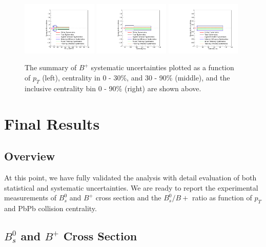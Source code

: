 \begin{figure}[hbtp]
\begin{center}
\includegraphics[width=0.32\textwidth]{Figures/Chapter5/BpPtSyst.pdf}
\includegraphics[width=0.32\textwidth]{Figures/Chapter5/BpCentSyst.pdf}
\includegraphics[width=0.32\textwidth]{Figures/Chapter5/BpIncSyst.pdf}
\caption{The summary of $B^+$ systematic uncertainties plotted as a function of $p_T$ (left), centrality in 0 - 30\%, and 30 - 90\% (middle), and the inclusive centrality bin 0 - 90\% (right) are shown above.}
\label{BPSystSumPlot}
\end{center}
\end{figure}

\clearpage

\section{Final Results} 

\subsection{Overview}

At this point, we have fully validated the analysis with detail evaluation of both statistical and systematic uncertainties. We are ready to report the experimental measurements of $B^0_s$ and $B^+$ cross section and the $B^0_s/B+$ ratio as function of $p_T$ and PbPb collision centrality.

\subsection{$B^0_s$ and $B^{+}$ Cross Section}

